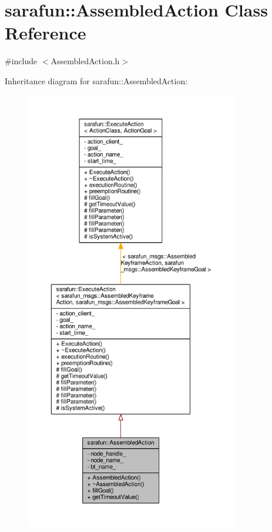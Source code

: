 \hypertarget{classsarafun_1_1AssembledAction}{\section{sarafun\-:\-:Assembled\-Action Class Reference}
\label{classsarafun_1_1AssembledAction}
}


{\ttfamily \#include $<$Assembled\-Action.\-h$>$}



Inheritance diagram for sarafun\-:\-:Assembled\-Action\-:\nopagebreak
\begin{figure}[H]
\begin{center}
\leavevmode
\includegraphics[height=550pt]{d9/d73/classsarafun_1_1AssembledAction__inherit__graph}
\end{center}
\end{figure}


